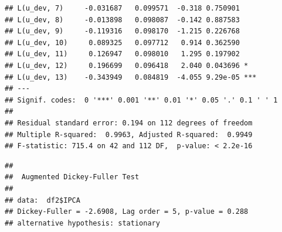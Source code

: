 \documentclass[
]{article}
\newenvironment{Shaded}{\begin{snugshade}}{\end{snugshade}}
\newcommand{\CommentTok}[1]{\textcolor[rgb]{0.56,0.35,0.01}{\textit{#1}}}
\newcommand{\DataTypeTok}[1]{\textcolor[rgb]{0.13,0.29,0.53}{#1}}
\newcommand{\DecValTok}[1]{\textcolor[rgb]{0.00,0.00,0.81}{#1}}
\newcommand{\KeywordTok}[1]{\textcolor[rgb]{0.13,0.29,0.53}{\textbf{#1}}}
\newcommand{\NormalTok}[1]{#1}
\newcommand{\OperatorTok}[1]{\textcolor[rgb]{0.81,0.36,0.00}{\textbf{#1}}}
\newcommand{\StringTok}[1]{\textcolor[rgb]{0.31,0.60,0.02}{#1}}
\begin{document}
\begin{verbatim}
## L(u_dev, 7)     -0.031687   0.099571  -0.318 0.750901    
## L(u_dev, 8)     -0.013898   0.098087  -0.142 0.887583    
## L(u_dev, 9)     -0.119316   0.098170  -1.215 0.226768    
## L(u_dev, 10)     0.089325   0.097712   0.914 0.362590    
## L(u_dev, 11)     0.126947   0.098010   1.295 0.197902    
## L(u_dev, 12)     0.196699   0.096418   2.040 0.043696 *  
## L(u_dev, 13)    -0.343949   0.084819  -4.055 9.29e-05 ***
## ---
## Signif. codes:  0 '***' 0.001 '**' 0.01 '*' 0.05 '.' 0.1 ' ' 1
## 
## Residual standard error: 0.194 on 112 degrees of freedom
## Multiple R-squared:  0.9963, Adjusted R-squared:  0.9949 
## F-statistic: 715.4 on 42 and 112 DF,  p-value: < 2.2e-16
\end{verbatim}

\begin{Shaded}
\end{Shaded}

\begin{verbatim}
## 
##  Augmented Dickey-Fuller Test
## 
## data:  df2$IPCA
## Dickey-Fuller = -2.6908, Lag order = 5, p-value = 0.288
## alternative hypothesis: stationary
\end{verbatim}

\begin{Shaded}
\end{Shaded}
\end{document}
